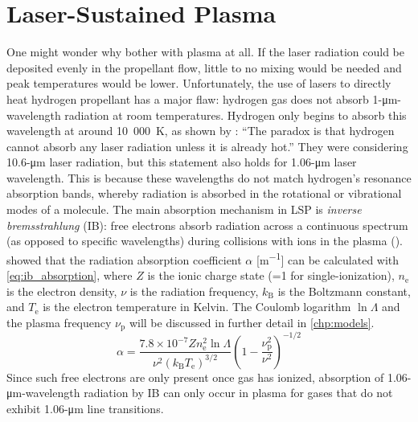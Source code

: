     \section{Laser-Sustained Plasma} \label{sec:background_lsp}
        One might wonder why bother with plasma at all. If the laser radiation could be deposited evenly in the propellant flow, little to no mixing would be needed and peak temperatures would be lower. Unfortunately, the use of lasers to directly heat hydrogen propellant has a major flaw: hydrogen gas does not absorb 1-\unit{\um}-wavelength radiation at room temperatures. Hydrogen only begins to absorb this wavelength at around 10~000~K, as shown by \textcite{glumbConceptsStatusLasersupported1984}: ``The paradox is that hydrogen cannot absorb any laser radiation unless it is already hot.'' They were considering 10.6-\unit{\um} laser radiation, but this statement also holds for 1.06-\unit{\um} laser wavelength. This is because these wavelengths do not match hydrogen's resonance absorption bands, whereby radiation is absorbed in the rotational or vibrational modes of a molecule. The main absorption mechanism in LSP is \emph{inverse bremsstrahlung} (IB): free electrons absorb radiation across a continuous spectrum (as opposed to specific wavelengths) during collisions with ions in the plasma (\textcite{keeferLaserSustainedPlasmas1989}). \textcite{johnstonCorrectValuesHighfrequency1973} showed that the radiation absorption coefficient $\alpha$ [\unit{m^{-1}}] can be calculated with \autoref{eq:ib_absorption}, where $Z$ is the ionic charge state (=1 for single-ionization), $n_\mathrm{e}$ is the electron density, $\nu$ is the radiation frequency, $k_\mathrm{B}$ is the Boltzmann constant, and $T_\mathrm{e}$ is the electron temperature in Kelvin. The Coulomb logarithm $\ln{\Lambda}$ and the plasma frequency $\nu_\mathrm{p}$ will be discussed in further detail in \autoref{chp:models}.
        \newcommand{\ibalphaeq}{\alpha = \frac{7.8\times 10^{-7}Zn_\mathrm{e}^2\ln{\Lambda}}{\nu^2(k_\mathrm{B}T_\mathrm{e})^{3/2}} \left(1-\frac{\nu_\mathrm{p}^2}{\nu^2}\right)^{-1/2}}
        \begin{equation}
            \ibalphaeq \label{eq:ib_absorption}
        \end{equation}
        Since such free electrons are only present once gas has ionized, absorption of 1.06-\unit{\um}-wavelength radiation by IB can only occur in plasma for gases that do not exhibit 1.06-\unit{\um} line transitions.

